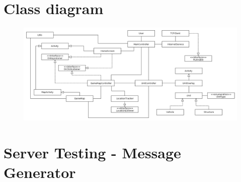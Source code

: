 \chapter{Class diagram}\label{ap_class}

\begin{figure}[H]
  \centering
  \includegraphics[height=0.29\textheight, angle=-90]{Images/diagrams/class.png}
\end{figure}



\chapter{Server Testing - Message Generator}\label{server_testing}


